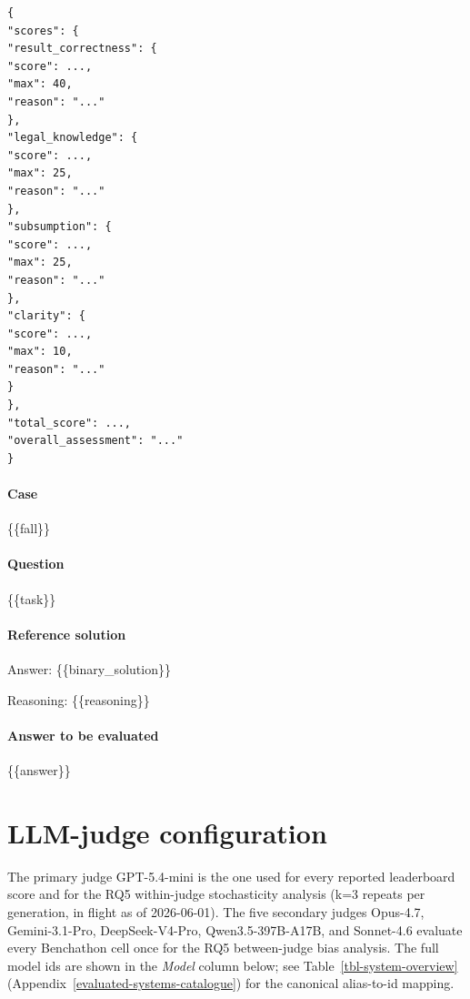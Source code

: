 \documentclass[11pt]{article}
\begin{document}
\begin{verbatim}
{
"scores": {
"result_correctness": {
"score": ...,
"max": 40,
"reason": "..."
},
"legal_knowledge": {
"score": ...,
"max": 25,
"reason": "..."
},
"subsumption": {
"score": ...,
"max": 25,
"reason": "..."
},
"clarity": {
"score": ...,
"max": 10,
"reason": "..."
}
},
"total_score": ...,
"overall_assessment": "..."
}
\end{verbatim}

\paragraph{Case}\label{case-1}

\{\{fall\}\}

\paragraph{Question}\label{question-1}

\{\{task\}\}

\paragraph{Reference solution}\label{reference-solution}

Answer: \{\{binary\_solution\}\}

Reasoning: \{\{reasoning\}\}

\paragraph{Answer to be evaluated}\label{answer-to-be-evaluated}

\{\{answer\}\}

\section{LLM-judge configuration}\label{llm-judge-configuration}

The primary judge GPT-5.4-mini is the one used for every reported
leaderboard score and for the RQ5 within-judge stochasticity analysis
(k=3 repeats per generation, in flight as of 2026-06-01). The five
secondary judges Opus-4.7, Gemini-3.1-Pro, DeepSeek-V4-Pro,
Qwen3.5-397B-A17B, and Sonnet-4.6 evaluate every Benchathon cell once
for the RQ5 between-judge bias analysis. The full model ids are shown in
the \emph{Model} column below; see Table~\ref{tbl-system-overview}
(Appendix~\ref{evaluated-systems-catalogue}) for the canonical
alias-to-id mapping.
\end{document}

